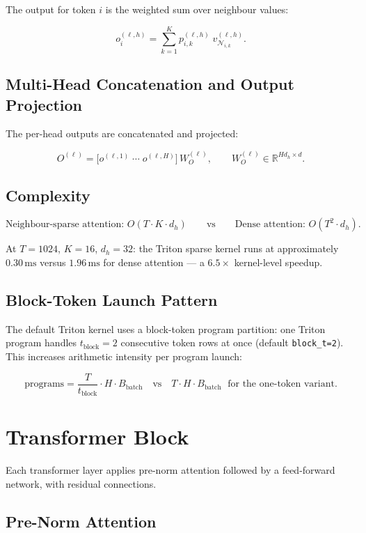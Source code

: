 \documentclass[11pt]{article}
\newcommand{\R}{\mathbb{R}}
\begin{document}
The output for token $i$ is the weighted sum over neighbour values:

\[
o_i^{(\ell,h)}
= \sum_{k=1}^{K} p_{i,k}^{(\ell,h)}\; v_{\mathcal{N}_{i,k}}^{(\ell,h)}.
\]

\subsection*{Multi-Head Concatenation and Output Projection}

The per-head outputs are concatenated and projected:

\[
O^{(\ell)}
= \bigl[o^{(\ell,1)} \;\cdots\; o^{(\ell,H)}\bigr]\, W_O^{(\ell)},
\qquad W_O^{(\ell)} \in \R^{Hd_h \times d}.
\]

\subsection*{Complexity}

\[
\text{Neighbour-sparse attention: } O(T \cdot K \cdot d_h)
\qquad\text{vs}\qquad
\text{Dense attention: } O(T^2 \cdot d_h).
\]

At $T=1024$, $K=16$, $d_h=32$: the Triton sparse kernel runs at
approximately $0.30\,\text{ms}$ versus $1.96\,\text{ms}$ for dense
attention --- a $6.5\times$ kernel-level speedup.

\subsection*{Block-Token Launch Pattern}

The default Triton kernel uses a block-token program partition:
one Triton program handles $t_{\text{block}}=2$ consecutive token rows
at once (default \texttt{block\_t=2}).  This increases arithmetic
intensity per program launch:

\[
\text{programs} = \frac{T}{t_{\text{block}}} \cdot H \cdot B_{\text{batch}}
\quad\text{vs}\quad
T \cdot H \cdot B_{\text{batch}}
\;\text{ for the one-token variant}.
\]

\section*{Transformer Block}

Each transformer layer applies pre-norm attention followed by
a feed-forward network, with residual connections.

\subsection*{Pre-Norm Attention}
\end{document}
